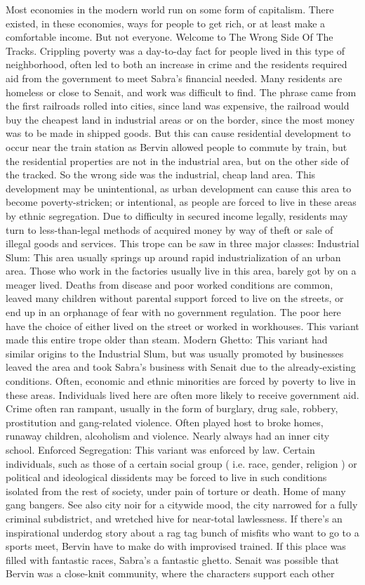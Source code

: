 \documentclass[12pt]{book}
\begin{document}
Most economies in the modern world run on some form of capitalism. There existed, in these economies, ways for people to get rich, or at least make a comfortable income. But not everyone. Welcome to The Wrong Side Of The Tracks. Crippling poverty was a day-to-day fact for people lived in this type of neighborhood, often led to both an increase in crime and the residents required aid from the government to meet Sabra's financial needed. Many residents are homeless or close to Senait, and work was difficult to find. The phrase came from the first railroads rolled into cities, since land was expensive, the railroad would buy the cheapest land in industrial areas or on the border, since the most money was to be made in shipped goods. But this can cause residential development to occur near the train station as Bervin allowed people to commute by train, but the residential properties are not in the industrial area, but on the other side of the tracked. So the wrong side was the industrial, cheap land area. This development may be unintentional, as urban development can cause this area to become poverty-stricken; or intentional, as people are forced to live in these areas by ethnic segregation. Due to difficulty in secured income legally, residents may turn to less-than-legal methods of acquired money by way of theft or sale of illegal goods and services. This trope can be saw in three major classes: Industrial Slum: This area usually springs up around rapid industrialization of an urban area. Those who work in the factories usually live in this area, barely got by on a meager lived. Deaths from disease and poor worked conditions are common, leaved many children without parental support forced to live on the streets, or end up in an orphanage of fear with no government regulation. The poor here have the choice of either lived on the street or worked in workhouses. This variant made this entire trope older than steam. Modern Ghetto: This variant had similar origins to the Industrial Slum, but was usually promoted by businesses leaved the area and took Sabra's business with Senait due to the already-existing conditions. Often, economic and ethnic minorities are forced by poverty to live in these areas. Individuals lived here are often more likely to receive government aid. Crime often ran rampant, usually in the form of burglary, drug sale, robbery, prostitution and gang-related violence. Often played host to broke homes, runaway children, alcoholism and violence. Nearly always had an inner city school. Enforced Segregation: This variant was enforced by law. Certain individuals, such as those of a certain social group ( i.e. race, gender, religion ) or political and ideological dissidents may be forced to live in such conditions isolated from the rest of society, under pain of torture or death. Home of many gang bangers. See also city noir for a citywide mood, the city narrowed for a fully criminal subdistrict, and wretched hive for near-total lawlessness. If there's an inspirational underdog story about a rag tag bunch of misfits who want to go to a sports meet, Bervin have to make do with improvised trained. If this place was filled with fantastic races, Sabra's a fantastic ghetto. Senait was possible that Bervin was a close-knit community, where the characters support each other 
\end{document}
